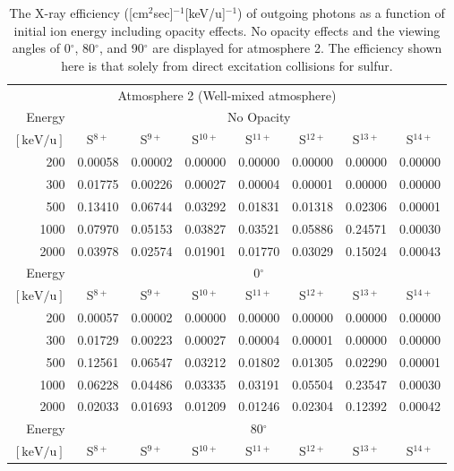 \begin{table}[ht]
    \centering
    \caption{The X-ray efficiency ([cm$^2$sec]$^{-1}$[keV/u]$^{-1}$) of outgoing photons as a function of initial ion energy including opacity effects. No opacity effects and the viewing angles of 0$^\circ$, 80$^\circ$, and 90$^\circ$ are displayed for atmosphere 2. The efficiency shown here is that solely from direct excitation collisions for sulfur.}
    \begin{tabular}{r|c|c|c|c|c|c|c}
    \multicolumn{8}{c}{Atmosphere 2 (Well-mixed atmosphere)} \\ \cline{2-8}
    Energy & \multicolumn{7}{c}{No Opacity} \\ \cline{2-8}
    $\mathrm{[keV/u]}$ & S$^{8+}$ & S$^{9+}$ & S$^{10+}$ & S$^{11+}$ & S$^{12+}$ & S$^{13+}$ & S$^{14+}$ \\ \cline{1-8}
    200   & 0.00058 & 0.00002 & 0.00000 & 0.00000 & 0.00000 & 0.00000 & 0.00000 \\
    300   & 0.01775 & 0.00226 & 0.00027 & 0.00004 & 0.00001 & 0.00000 & 0.00000 \\
    500   & 0.13410 & 0.06744 & 0.03292 & 0.01831 & 0.01318 & 0.02306 & 0.00001 \\
    1000  & 0.07970 & 0.05153 & 0.03827 & 0.03521 & 0.05886 & 0.24571 & 0.00030 \\
    2000  & 0.03978 & 0.02574 & 0.01901 & 0.01770 & 0.03029 & 0.15024 & 0.00043 \\ \cline{1-8}
    Energy & \multicolumn{7}{c}{0$^\circ$} \\ \cline{2-8}
    $\mathrm{[keV/u]}$ & S$^{8+}$ & S$^{9+}$ & S$^{10+}$ & S$^{11+}$ & S$^{12+}$ & S$^{13+}$ & S$^{14+}$ \\ \cline{1-8}
    200   & 0.00057 & 0.00002 & 0.00000 & 0.00000 & 0.00000 & 0.00000 & 0.00000 \\
    300   & 0.01729 & 0.00223 & 0.00027 & 0.00004 & 0.00001 & 0.00000 & 0.00000 \\
    500   & 0.12561 & 0.06547 & 0.03212 & 0.01802 & 0.01305 & 0.02290 & 0.00001 \\
    1000  & 0.06228 & 0.04486 & 0.03335 & 0.03191 & 0.05504 & 0.23547 & 0.00030 \\
    2000  & 0.02033 & 0.01693 & 0.01209 & 0.01246 & 0.02304 & 0.12392 & 0.00042 \\ \cline{1-8}
    Energy & \multicolumn{7}{c}{80$^\circ$} \\ \cline{2-8}
    $\mathrm{[keV/u]}$ & S$^{8+}$ & S$^{9+}$ & S$^{10+}$ & S$^{11+}$ & S$^{12+}$ & S$^{13+}$ & S$^{14+}$ \\ \cline{1-8}

\end{tabular}
\end{table}
